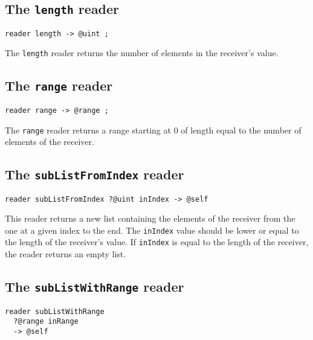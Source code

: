 \subsection{The \lstinline[language=galgas]!length! reader}

\begin{lstlisting}[language=galgas]
reader length -> @uint ;
\end{lstlisting}

The \lstinline[language=galgas]!length! reader returns the number of elements in the receiver's value.


\subsection{The \lstinline[language=galgas]!range! reader}

\begin{lstlisting}[language=galgas]
reader range -> @range ;
\end{lstlisting}

The \lstinline[language=galgas]!range! reader returns a range starting at $0$ of length equal to the number of elements of the receiver.




\subsection{The \lstinline[language=galgas]!subListFromIndex! reader}

\begin{lstlisting}[language=galgas]
reader subListFromIndex ?@uint inIndex -> @self
\end{lstlisting}

This reader returns a new list containing the elements of the receiver from the one at a given index to the end. The  \lstinline[language=galgas]!inIndex! value should be lower or equal to the length of the receiver's value. If \lstinline[language=galgas]!inIndex! is equal to the length of the receiver, the reader returns an empty list.


\subsection{The \lstinline[language=galgas]!subListWithRange! reader}

\begin{lstlisting}[language=galgas]
reader subListWithRange
  ?@range inRange
  -> @self
\end{lstlisting}

